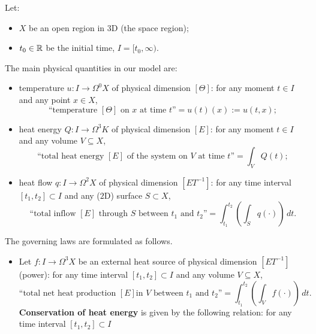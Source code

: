 \begin{discussion}
  Let:
  \begin{itemize}
    \item $X$ be an open region in $3$D (the space region);
    \item $t_0 \in \mathbb{R}$ be the initial time, $I = [t_0, \infty)$.
  \end{itemize}
  The main physical quantities in our model are:
  \begin{itemize}
    \item
      temperature $u \colon I \to \Omega^0 X$ of physical dimension $[\Theta]$:
      for any moment $t \in I$ and any point $x \in X$,
      \begin{equation}
        \text{``temperature $[\Theta]$ on $x$ at time $t$''}
        = u(t)(x) := u(t, x);
      \end{equation}
    \item
      heat energy $Q \colon I \to \Omega^3 K$ of physical dimension $[E]$:
      for any moment $t \in I$ and any volume $V \subseteq X$,
      \begin{equation}
        \text{``total heat energy $[E]$ of the system on $V$ at time $t$''}
        = \int_V Q(t);
      \end{equation}
    \item
      heat flow $q \colon I \to \Omega^2 X$ of physical dimension $[E T^{-1}]$:
      for any time interval $[t_1, t_2] \subset I$
      and any ($2$D) surface $S \subset X$,
      \begin{equation}
        \text{``total inflow $[E]$ through $S$ between $t_1$ and $t_2$''}
        = \int_{t_1}^{t_2} \left(\int_S q(\cdot) \right)\, d t.
      \end{equation}
  \end{itemize}
  The governing laws are formulated as follows.
  \begin{itemize}
    \item
      Let $f \colon I \to \Omega^3 X$ be an external heat source
      of physical dimension $[E T^{-1}]$ (power):
      for any time interval $[t_1, t_2] \subset I$
      and any volume $V \subseteq X$,
      \begin{equation}
        \text{``total net heat production $[E]$
          in $V$ between $t_1$ and $t_2$''}
        = \int_{t_1}^{t_2} \left(\int_V f(\cdot) \right)\, d t.
      \end{equation}
      \textbf{Conservation of heat energy} is given by the following relation:
      for any time interval $[t_1, t_2] \subset I$

\end{itemize}
\end{discussion}
